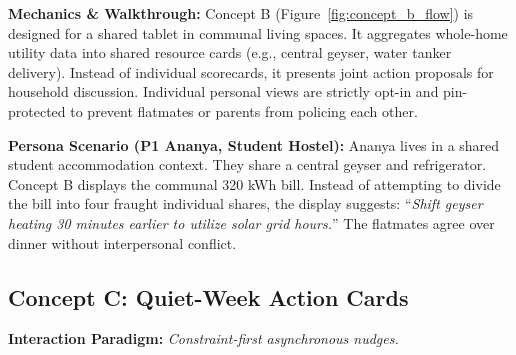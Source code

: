 \documentclass[12pt,a4paper]{article}
\begin{document}
\textbf{Mechanics \& Walkthrough:} Concept B (Figure~\ref{fig:concept_b_flow}) is designed for a shared tablet in communal living spaces. It aggregates whole-home utility data into shared resource cards (e.g., central geyser, water tanker delivery). Instead of individual scorecards, it presents joint action proposals for household discussion. Individual personal views are strictly opt-in and pin-protected to prevent flatmates or parents from policing each other.

\textbf{Persona Scenario (P1 Ananya, Student Hostel):} Ananya lives in a shared student accommodation context. They share a central geyser and refrigerator. Concept B displays the communal 320 kWh bill. Instead of attempting to divide the bill into four fraught individual shares, the display suggests: ``\emph{Shift geyser heating 30 minutes earlier to utilize solar grid hours.}'' The flatmates agree over dinner without interpersonal conflict.

\subsection{Concept C: Quiet-Week Action Cards}
\textbf{Interaction Paradigm:} \emph{Constraint-first asynchronous nudges.}
\end{document}
